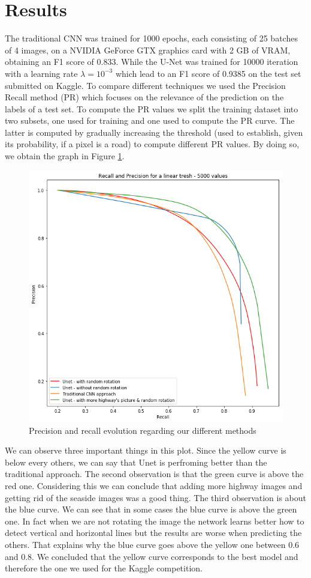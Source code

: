 \documentclass[10pt,conference,compsocconf]{IEEEtran}
\begin{document}
\section{Results}
\label{sec:results}

	The traditional CNN was trained for 1000 epochs, each consisting of 25 batches of 4 images, on a NVIDIA GeForce GTX graphics card with 2 GB of VRAM, obtaining an F1 score of 0.833. While the U-Net was trained for 10000 iteration with a learning rate $\lambda = 10^{-3}$ which lead to an F1 score of 0.9385 on the test set submitted on Kaggle.
	To compare different techniques we used the Precision Recall method (PR) which focuses on the relevance of the prediction on the labels of a test set. To compute the PR values we split the training dataset into two subsets, one used for training and one used to compute the PR curve. The latter is computed by gradually increasing the threshold (used to establish, given its probability, if a pixel is a road) to compute different PR values. By doing so, we obtain the graph in Figure \ref{fig:pr}.

	\begin{figure}[h]
		\centering
		\includegraphics[width=0.8\columnwidth]{img/pr_curve.png}
		\caption{Precision and recall evolution regarding our different methods}
		\label{fig:pr}
	\end{figure}
	
	We can observe three important things in this plot. Since the yellow curve is below every others, we can say that Unet is perfroming better than the traditional approach. The second observation is that the green curve is above the red one. Considering this we can conclude that adding more highway images and getting rid of the seaside images was a good thing. The third observation is about the blue curve. We can see that in some cases the blue curve is above the green one. In fact when we are not rotating the image the network learns better how to detect vertical and horizontal lines but the results are worse when predicting the others. That explains why the blue curve goes above the yellow one between 0.6 and 0.8. We concluded that the yellow curve corresponds to the best model and therefore the one we used for the Kaggle competition.
	
\end{document}
